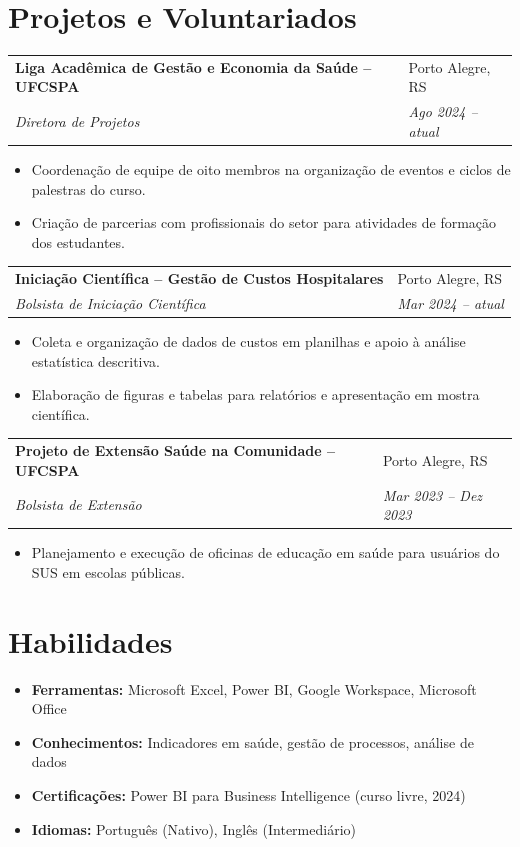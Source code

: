\documentclass[a4paper,10pt]{article}
\makeatletter
\newcommand{\cventry}[4]{%
    \noindent\begin{tabularx}{\textwidth}{@{}>{\raggedright\arraybackslash}X >{\raggedleft\arraybackslash}X@{}}
    \textbf{#1} & #2 \\ \textit{#3} & \textit{#4} \\ \end{tabularx}}
\makeatother
\begin{document}
\section{Projetos e Voluntariados}

    \cventry{Liga Acadêmica de Gestão e Economia da Saúde -- UFCSPA}{Porto Alegre, RS}{Diretora de Projetos}{Ago 2024 -- atual}
        \begin{itemize}
            \item Coordenação de equipe de oito membros na organização de eventos e ciclos de palestras do curso.
            \item Criação de parcerias com profissionais do setor para atividades de formação dos estudantes.
        \end{itemize}

    \cventry{Iniciação Científica -- Gestão de Custos Hospitalares}{Porto Alegre, RS}{Bolsista de Iniciação Científica}{Mar 2024 -- atual}
        \begin{itemize}
            \item Coleta e organização de dados de custos em planilhas e apoio à análise estatística descritiva.
            \item Elaboração de figuras e tabelas para relatórios e apresentação em mostra científica.
        \end{itemize}

    \cventry{Projeto de Extensão Saúde na Comunidade -- UFCSPA}{Porto Alegre, RS}{Bolsista de Extensão}{Mar 2023 -- Dez 2023}
        \begin{itemize}
            \item Planejamento e execução de oficinas de educação em saúde para usuários do SUS em escolas públicas.
        \end{itemize}

\section{Habilidades}
    \begin{itemize}
        \item \textbf{Ferramentas:} Microsoft Excel, Power BI, Google Workspace, Microsoft Office
        \item \textbf{Conhecimentos:} Indicadores em saúde, gestão de processos, análise de dados
        \item \textbf{Certificações:} Power BI para Business Intelligence (curso livre, 2024)
        \item \textbf{Idiomas:} Português (Nativo), Inglês (Intermediário)
    \end{itemize}
\end{document}

